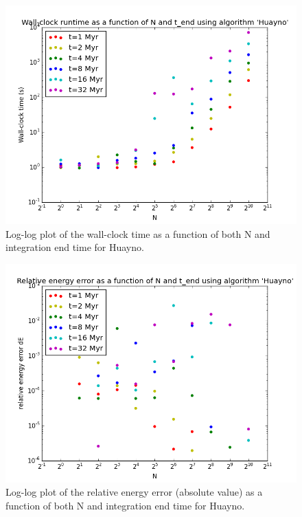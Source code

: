 \documentclass{aa}
\begin{document}
   \begin{figure}
   \centering
   \includegraphics[width=\hsize]{img/CA_GD_TLRH_s1603221_SS_s1617451_Huayno_runtime_log.png}
      \caption{Log-log plot of the wall-clock time as a function of both N and integration 
               end time for Huayno.
              }
         \label{fig:Huayno_runtime}
   \end{figure}
   
   \begin{figure}
   \centering
   \includegraphics[width=\hsize]{img/CA_GD_TLRH_s1603221_SS_s1617451_Huayno_dE_log.png}
      \caption{Log-log plot of the relative energy error (absolute value) as a function of both N and integration 
               end time for Huayno.
              }
         \label{fig:Huayno_dE}
   \end{figure}
   
\end{document}
